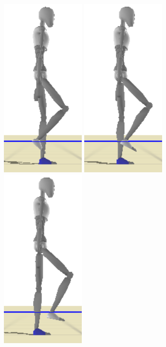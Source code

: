 \documentclass[conference]{acmsiggraph}
\begin{document}
\begin{figure}[t]
\includegraphics[scale=0.17]{images/strips/0_25/4.png}
\includegraphics[scale=0.17]{images/strips/0_25/5.png}
\includegraphics[scale=0.17]{images/strips/0_25/6.png}

\end{figure}
\end{document}
